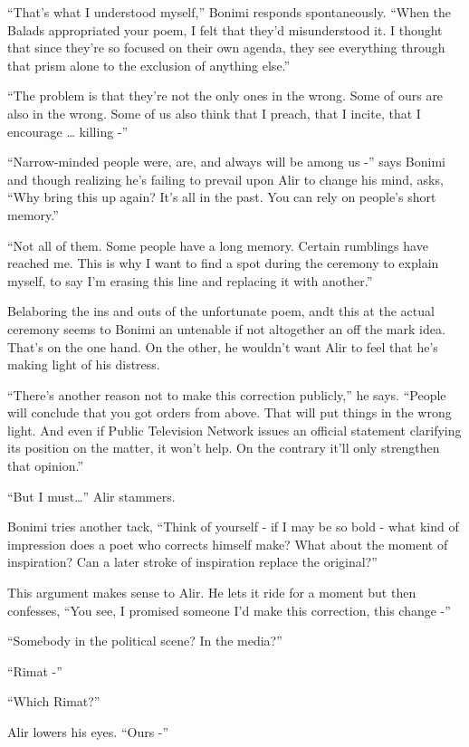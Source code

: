\documentclass[twoside,11pt]{book}
\begin{document}
``That's what I understood myself,'' Bonimi responds spontaneously. ``When the
Balads appropriated your poem, I felt that they'd misunderstood it. I thought that since they're so focused on their
own agenda, they see everything through that prism alone to the exclusion of anything else.''

``The problem is that they're not the only ones in the wrong. Some of ours are also in the wrong. Some of
us also think that I preach, that I incite, that I encourage {\dots} killing -''

``Narrow-minded people were, are, and always will be among us -'' says Bonimi and though
realizing he's failing to prevail upon Alir to change his mind, asks, ``Why bring this up again? It's
all in the past. You can rely on people's short memory.''

``Not all of them. Some people have a long memory. Certain rumblings have reached me. This is why I want to
find a spot during the ceremony to explain myself, to say I'm erasing this line and replacing it with
another.''

Belaboring the ins and outs of the unfortunate poem, andt this at the actual ceremony seems to Bonimi an untenable if
not altogether an off the mark idea. That's on the one hand. On the other, he wouldn't want Alir to feel that he's
making light of his distress.

``There's another reason not to make this correction publicly,'' he says. ``People will conclude that you
got orders from above. That will put things in the wrong light. And even if Public Television Network issues an
official statement clarifying its position on the matter, it won't help. On the contrary it'll only strengthen that
opinion.''

``But I must{\dots}'' Alir stammers.

Bonimi tries another tack, ``Think of yourself - if I may be so bold - what kind of impression does a poet
who corrects himself make? What about the moment of inspiration? Can a later stroke of inspiration replace the
original?''

This argument makes sense to Alir. He lets it ride for a moment but then confesses, ``You see, I promised
someone I'd make this correction, this change -''

``Somebody in the political scene? In the media?''

``Rimat -''

``Which Rimat?''

Alir lowers his eyes. ``Ours -''
\end{document}
